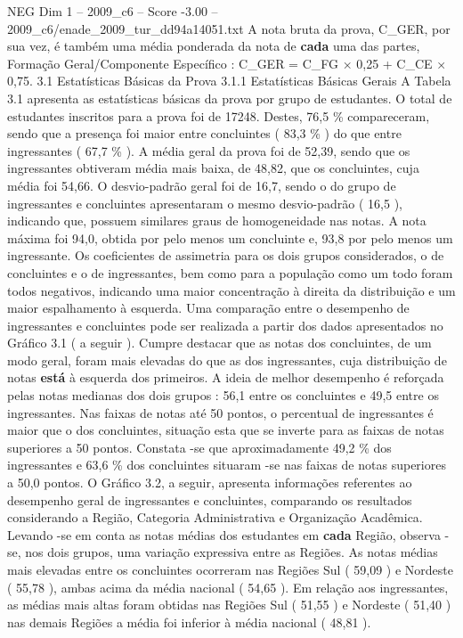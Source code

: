 \begin{textsample}{NEG Dim 1 – 2009\_c6 – Score -3.00 – 2009\_c6/enade\_2009\_tur\_dd94a14051.txt}
A nota bruta da prova, C\_GER, por sua vez, é também uma média ponderada da nota de \textbf{cada} uma das partes, Formação Geral/Componente Específico : C\_GER = C\_FG × 0,25 + C\_CE × 0,75. 3.1 Estatísticas Básicas da Prova 3.1.1 Estatísticas Básicas Gerais A Tabela 3.1 apresenta as estatísticas básicas da prova por grupo de estudantes.
O total de estudantes inscritos para a prova foi de 17248.
Destes, 76,5 \% compareceram, sendo que a presença foi maior entre concluintes ( 83,3 \% ) do que entre ingressantes ( 67,7 \% ).
A média geral da prova foi de 52,39, sendo que os ingressantes obtiveram média mais baixa, de 48,82, que os concluintes, cuja média foi 54,66.
O desvio-padrão geral foi de 16,7, sendo o do grupo de ingressantes e concluintes apresentaram o mesmo desvio-padrão ( 16,5 ), indicando que, possuem similares graus de homogeneidade nas notas.
A nota máxima foi 94,0, obtida por pelo menos um concluinte e, 93,8 por pelo menos um ingressante.
Os coeficientes de assimetria para os dois grupos considerados, o de concluintes e o de ingressantes, bem como para a população como um todo foram todos negativos, indicando uma maior concentração à direita da distribuição e um maior espalhamento à esquerda.
Uma comparação entre o desempenho de ingressantes e concluintes pode ser realizada a partir dos dados apresentados no Gráfico 3.1 ( a seguir ).
Cumpre destacar que as notas dos concluintes, de um modo geral, foram mais elevadas do que as dos ingressantes, cuja distribuição de notas \textbf{está} à esquerda dos primeiros.
A ideia de melhor desempenho é reforçada pelas notas medianas dos dois grupos : 56,1 entre os concluintes e 49,5 entre os ingressantes.
Nas faixas de notas até 50 pontos, o percentual de ingressantes é maior que o dos concluintes, situação esta que se inverte para as faixas de notas superiores a 50 pontos.
Constata -se que aproximadamente 49,2 \% dos ingressantes e 63,6 \% dos concluintes situaram -se nas faixas de notas superiores a 50,0 pontos.
O Gráfico 3.2, a seguir, apresenta informações referentes ao desempenho geral de ingressantes e concluintes, comparando os resultados considerando a Região, Categoria Administrativa e Organização Acadêmica.
Levando -se em conta as notas médias dos estudantes em \textbf{cada} Região, observa -se, nos dois grupos, uma variação expressiva entre as Regiões.
As notas médias mais elevadas entre os concluintes ocorreram nas Regiões Sul ( 59,09 ) e Nordeste ( 55,78 ), ambas acima da média nacional ( 54,65 ).
Em relação aos ingressantes, as médias mais altas foram obtidas nas Regiões Sul ( 51,55 ) e Nordeste ( 51,40 ) nas demais Regiões a média foi inferior à média nacional ( 48,81 ).

\end{textsample}
